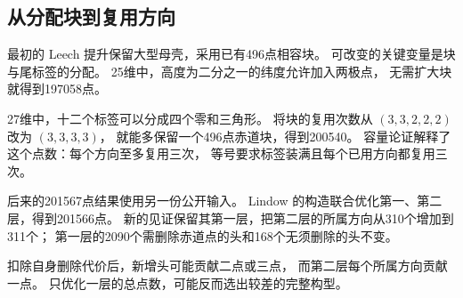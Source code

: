 \subsection{从分配块到复用方向}

最初的 Leech 提升保留大型母壳，采用已有496点相容块。
可改变的关键变量是块与尾标签的分配。
25维中，高度为二分之一的纬度允许加入两极点，
无需扩大块就得到197058点。

27维中，十二个标签可以分成四个零和三角形。
将块的复用次数从 $(3,3,2,2,2)$ 改为 $(3,3,3,3)$，
就能多保留一个496点赤道块，得到200540。
容量论证解释了这个点数：每个方向至多复用三次，
等号要求标签装满且每个已用方向都复用三次。

后来的201567点结果使用另一份公开输入。
Lindow 的构造联合优化第一、第二层，得到201566点。
新的见证保留其第一层，把第二层的所属方向从310个增加到311个；
第一层的2090个需删除赤道点的头和168个无须删除的头不变。

扣除自身删除代价后，新增头可能贡献二点或三点，
而第二层每个所属方向贡献一点。
只优化一层的总点数，可能反而选出较差的完整构型。
